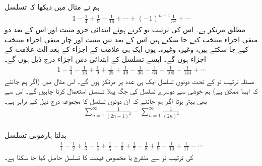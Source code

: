 ہم نے مثال  میں دیکھا کہ تسلسل
\begin{align*}
1-\frac{1}{4}+\frac{1}{9}-\frac{1}{16}+\cdots+(-1)^{n-1}\frac{1}{n^2}+\cdots
\end{align*}
مطلق مرتکز ہے۔ اس کی ترتیب نو کرتے ہوئے ابتدائی جزو مثبت اور اس  کے بعد دو منفی اجزاء منتخب کیے جا سکتے ہیں۔اس کے بعد تین مثبت اور چار منفی اجزاء  منتخب کیے جا سکتے ہیں، وغیرہ وغیرہ۔ یوں ایک ہی علامت کے  اجزاء کے بعد الٹ علامت کے  اجزاء ہوں گے۔ ایسے تسلسل کے ابتدائی دس اجزاء درج ذیل ہوں گے۔
\begin{align*}
1-\frac{1}{4}-\frac{1}{16}+\frac{1}{9}+\frac{1}{25}+\frac{1}{49}-\frac{1}{36}-\frac{1}{64}-\frac{1}{100}-\frac{1}{144}+\cdots
\end{align*}
مسئلہ ترتیب نو کے تحت دونوں تسلسل ایک ہی عدد پر مرتکز ہوں گے۔ اس مثال میں (اگر ہم جانتے کہ ایسا ممکن ہے) ہم خوشی سے دوسرے تسلسل کی جگہ پہلا تسلسل استعمال کرنا چاہیں گے۔ اس سے بھی بہتر ہوتا اگر ہم جانتے کہ ان دونوں تسلسل کا مجموعہ درج ذیل کے برابر ہے۔
\begin{align*}
\sum_{n=1}^{\infty}\frac{1}{(2n-1)^2}-\sum_{n=1}^{\infty}\frac{1}{(2n)^2}
\end{align*}
\\
بدلتا ہارمونی تسلسل
\begin{align*}
\frac{1}{1}-\frac{1}{2}+\frac{1}{3}-\frac{1}{4}+\frac{1}{5}-\frac{1}{6}+\frac{1}{7}-\frac{1}{8}+\frac{1}{9}-\frac{1}{10}+\frac{1}{11}-\cdots
\end{align*}
کی ترتیب نو سے منفرج  یا مخصوص قیمت کا تسلسل حاصل کیا جا سکتا ہے۔
